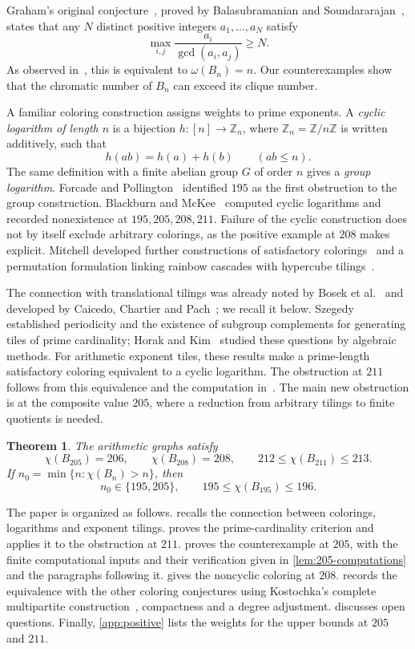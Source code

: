 \documentclass[11pt,reqno]{amsart}
\newcommand{\Z}{\mathbb Z}
\newtheorem{theorem}{Theorem}[section]
\theoremstyle{definition}
\theoremstyle{remark}
\numberwithin{equation}{section}
\begin{document}
Graham's original conjecture~\cite{Graham}, proved by Balasubramanian and Soundararajan~\cite{BS}, states that any $N$ distinct positive integers $a_1,\ldots,a_N$ satisfy
\begin{equation}\label{eq:graham}
 \max_{i,j}\frac{a_i}{\gcd(a_i,a_j)}\ge N.
\end{equation}
As observed in~\cite{Bosek}, this is equivalent to $\omega(B_n)=n$.
Our counterexamples show that the chromatic number of $B_n$ can exceed its clique number.

A familiar coloring construction assigns weights to prime exponents.
A \emph{cyclic logarithm of length $n$} is a bijection $h:[n]\to\Z_n$, where $\Z_n=\Z/n\Z$ is written additively, such that
\[
 h(ab)=h(a)+h(b)\qquad(ab\le n).
\]
The same definition with a finite abelian group $G$ of order $n$ gives a \emph{group logarithm}.
Forcade and Pollington~\cite{FP} identified $195$ as the first obstruction to the group construction.
Blackburn and McKee~\cite{BM} computed cyclic logarithms and recorded nonexistence at $195,205,208,211$.
Failure of the cyclic construction does not by itself exclude arbitrary colorings, as the positive example at $208$ makes explicit.
Mitchell developed further constructions of satisfactory colorings~\cite{Mitchell2019} and a permutation formulation linking rainbow cascades with hypercube tilings~\cite{Mitchell2023}.

The connection with translational tilings was already noted by Bosek et al.~\cite{Bosek} and developed by Caicedo, Chartier and Pach~\cite{CCP}; we recall it below.
Szegedy~\cite{Szegedy} established periodicity and the existence of
subgroup complements for generating tiles of prime cardinality;
Horak and Kim~\cite{HK} studied these questions by algebraic methods.
For arithmetic exponent tiles, these results make a prime-length
satisfactory coloring equivalent to a cyclic logarithm. The obstruction
at $211$ follows from this equivalence and the computation in~\cite{BM}.
The main new obstruction is at the composite value $205$, where a
reduction from arbitrary tilings to finite quotients is needed.

\begin{theorem}\label{thm:main}
The arithmetic graphs satisfy
\[
 \chi(B_{205})=206,\qquad
 \chi(B_{208})=208,\qquad
 212\le\chi(B_{211})\le213.
\]
If $n_0=\min\{n:\chi(B_n)>n\}$, then
\[
 n_0\in\{195,205\},\qquad 195\le\chi(B_{195})\le196.
\]
\end{theorem}

The paper is organized as follows.  recalls the
connection between colorings, logarithms and exponent tilings.
 proves the prime-cardinality criterion and applies it
to the obstruction at $211$.  proves the counterexample
at $205$, with the finite computational inputs and their verification
given in \cref{lem:205-computations} and the paragraphs following it.
 gives the noncyclic coloring at $208$.
 records the equivalence with the other coloring
conjectures using Kostochka's complete multipartite
construction~\cite{Kostochka}, compactness and a degree adjustment.
 discusses open questions.
Finally, \cref{app:positive} lists the weights for the upper bounds at
$205$ and $211$.
\end{document}
